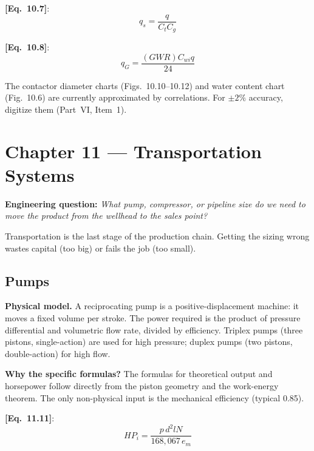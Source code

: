 \documentclass[11pt,a4paper,openany]{book}
\newcommand{\eqrefbook}[1]{\textcolor{blue!60!black}{\textbf{[Eq.~#1]}}}
\begin{document}
\eqrefbook{10.7}:
\begin{equation}
  q_s = \frac{q}{C_t C_g}
\end{equation}

\eqrefbook{10.8}:
\begin{equation}
  q_G = \frac{(GWR) C_{wi} q}{24}
\end{equation}

\begin{warnbox}
The contactor diameter charts (Figs.~10.10--10.12) and water content
chart (Fig.~10.6) are currently approximated by correlations. For
$\pm 2\%$ accuracy, digitize them (Part~VI, Item~1).
\end{warnbox}

\chapter{Chapter 11 — Transportation Systems}

\begin{purpose}
\textbf{Engineering question:} \emph{What pump, compressor, or
pipeline size do we need to move the product from the wellhead to the
sales point?}

Transportation is the last stage of the production chain. Getting the
sizing wrong wastes capital (too big) or fails the job (too small).
\end{purpose}

\section{Pumps}

\begin{theory}
\textbf{Physical model.} A reciprocating pump is a positive-displacement
machine: it moves a fixed volume per stroke. The power required is
the product of pressure differential and volumetric flow rate, divided
by efficiency. Triplex pumps (three pistons, single-action) are used
for high pressure; duplex pumps (two pistons, double-action) for high
flow.

\textbf{Why the specific formulas?} The formulas for theoretical
output and horsepower follow directly from the piston geometry and the
work-energy theorem. The only non-physical input is the mechanical
efficiency (typical 0.85).
\end{theory}

\eqrefbook{11.11}:
\begin{equation}
  HP_i = \frac{p\,d^2 l N}{168{,}067\,e_m}
\end{equation}
\end{document}
